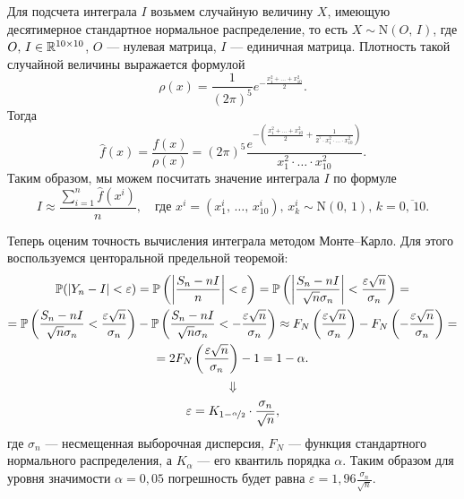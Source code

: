 Для подсчета интеграла $I$ возьмем случайную величину $X$, имеющую десятимерное стандартное нормальное распределение, то есть $X \sim \mbox{N} (O,\,I)$, где $O,\,I \in \mathbb{R}^{10 \times 10}$, $O$ --- нулевая матрица, $I$ --- единичная матрица. Плотность такой случайной величины выражается формулой
$$
        \rho(x)
        =
        \frac{1}{(2\pi)^5}
        e^{-\frac{x_1^2 + \ldots + x_{10}^2}{2}}.
$$
Тогда
$$
\boxed{
        \hat f(x) = \frac{f(x)}{\rho(x)}
        =
        (2\pi)^5
        \frac
        {
                e^{-\left(\frac{x_1^2 + \ldots + x_{10}^2}{2} + \frac{1}{2^7 \cdot x_1^2 \cdot \ldots \cdot x_{10}^2}\right)}
        }
        {x_1^2 \cdot \ldots \cdot x_{10}^2}.
}
$$
Таким образом, мы можем посчитать значение интеграла $I$ по формуле
$$
\boxed{
        I
        \approx
        \frac
        {\sum_{i=1}^{n} \hat f(x^i)}
        {n},
        \quad
        \mbox{где $x^i = (x_1^i,\,\ldots,\,x_{10}^i)$, $x_k^i\sim\mbox{N}(0,\,1)$, $k = \overline{0,\,10}$.}
}
$$

Теперь оценим точность вычисления интеграла методом Монте--Карло. Для этого воспользуемся центоральной предельной теоремой:
\begin{multline*}
        \mathbb{P}(|Y_n - I| < \varepsilon)
        =
        \mathbb{P}\left( \left| \frac{S_n - nI}{n} \right| < \varepsilon \right)
        =
        \mathbb{P}\left( \left| \frac{S_n - nI}{\sqrt{n}\sigma_n} \right| < \frac{\varepsilon\sqrt{n}}{\sigma_n} \right)
        =\\=
        \mathbb{P}\left( \frac{S_n - nI}{\sqrt{n}\sigma_n}  < \frac{\varepsilon\sqrt{n}}{\sigma_n} \right)
        -
        \mathbb{P}\left( \frac{S_n - nI}{\sqrt{n}\sigma_n}  < -\frac{\varepsilon\sqrt{n}}{\sigma_n} \right)
        \approx
        F_N\left(\frac{\varepsilon\sqrt{n}}{\sigma_n}\right) - F_N\left(-\frac{\varepsilon\sqrt{n}}{\sigma_n}\right)
        =\\=
        2 F_N\left(\frac{\varepsilon\sqrt{n}}{\sigma_n}\right) - 1
        =
        1 - \alpha.
\end{multline*}
$$
        \Downarrow
$$
$$
        \varepsilon = K_{1 - \nicefrac{\alpha}{2}}\cdot \frac{\sigma_n}{\sqrt{n}},
$$
где $\sigma_n$ --- несмещенная выборочная дисперсия, $F_N$ --- функция стандартного нормального распределения, а $K_\alpha$ --- его квантиль порядка $\alpha$. Таким образом для уровня значимости $\alpha = 0,05$ погрешность будет равна $\varepsilon = 1,96\frac{\sigma_n}{\sqrt{n}}$.

